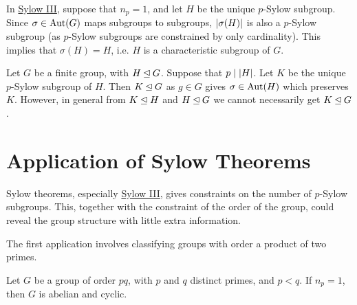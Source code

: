 \documentclass{article}
\begin{document}
\begin{remark}
    In \hyperref[thm: Sylow III]{Sylow III}, suppose that $n_p = 1$, and let $H$ be the unique $p$-Sylow subgroup. Since $\sigma \in \mathrm{Aut}(G)$ maps subgroups to subgroups, $\left|\sigma(H)\right|$ is also a $p$-Sylow subgroup (as $p$-Sylow subgroups are constrained by only cardinality). This implies that $\sigma(H) = H$, i.e. $H$ is a characteristic subgroup of $G$.
\end{remark}

\begin{example}
    Let $G$ be a finite group, with $H \unlhd G$. Suppose that $p \mid \left|H\right|$. Let $K$ be the unique $p$-Sylow subgroup of $H$. Then $K \unlhd G$ as $g \in G$ gives $\sigma \in \mathrm{Aut}(H)$ which preserves $K$. However, in general from $K \unlhd H$ and $H \unlhd G$ we cannot necessarily get $K \unlhd G$.
\end{example}

\section{Application of Sylow Theorems}

\textstart
Sylow theorems, especially \hyperref[thm: Sylow III]{Sylow III}, gives constraints on the number of $p$-Sylow subgroups. This, together with the constraint of the order of the group, could reveal the group structure with little extra information.

The first application involves classifying groups with order a product of two primes.

\begin{proposition}
    Let $G$ be a group of order $pq$, with $p$ and $q$ distinct primes, and $p < q$. If $n_p = 1$, then $G$ is abelian and cyclic.
\end{proposition}
\end{document}
